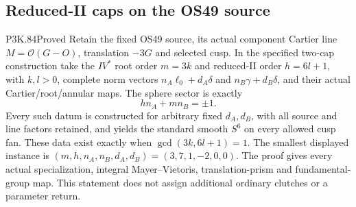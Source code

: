 \subsection{Reduced-II caps on the OS49 source}
\begin{statement}{P3K.84}{Proved}
Retain the fixed OS49 source, its actual component Cartier line
\(M=\mathcal O(G-O)\), translation \(-3G\) and selected cusp. In the
specified two-cap construction take the \(IV^*\) root order \(m=3k\)
and reduced-II order \(h=6l+1\), with \(k,l>0\), complete norm vectors
\(n_A\ell_0+d_A\delta\) and \(n_B\gamma+d_B\delta\), and their actual
Cartier/root/annular maps. The sphere sector is exactly
\[
                    h n_A+m n_B=\pm1.
\]
Every such datum is constructed for arbitrary fixed \(d_A,d_B\), with
all source and line factors retained, and yields the standard smooth
\(S^6\) on every allowed cusp fan. These data exist exactly when
\(\gcd(3k,6l+1)=1\). The smallest displayed instance is
\((m,h,n_A,n_B,d_A,d_B)=(3,7,1,-2,0,0)\).
The proof gives every actual specialization, integral Mayer--Vietoris,
translation-prism and fundamental-group map. This statement does not assign
additional ordinary clutches or a parameter return.
\end{statement}
